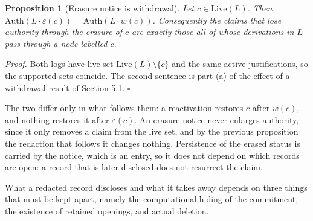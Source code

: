 \documentclass[11pt]{article}
\theoremstyle{plain}
\newtheorem{proposition}{Proposition}
\theoremstyle{definition}
\theoremstyle{remark}
\begin{document}
\begin{proposition}[Erasure notice is withdrawal]
Let $c\in\mathrm{Live}(L)$. Then $\mathrm{Auth}(L\cdot\varepsilon(c))=\mathrm{Auth}(L\cdot w(c))$. Consequently the claims that lose authority through the erasure of $c$ are exactly those all of whose derivations in $L$ pass through a node labelled $c$.
\end{proposition}
\emph{Proof.} Both logs have live set $\mathrm{Live}(L)\setminus\{c\}$ and the same active justifications, so the supported sets coincide. The second sentence is part (a) of the effect-of-a-withdrawal result of Section 5.1. \hfill$\square$

The two differ only in what follows them: a reactivation restores $c$ after $w(c)$, and nothing restores it after $\varepsilon(c)$. An erasure notice never enlarges authority, since it only removes a claim from the live set, and by the previous proposition the redaction that follows it changes nothing. Persistence of the erased status is carried by the notice, which is an entry, so it does not depend on which records are open: a record that is later disclosed does not resurrect the claim.

What a redacted record discloses and what it takes away depends on three things that must be kept apart, namely the computational hiding of the commitment, the existence of retained openings, and actual deletion.
\end{document}
